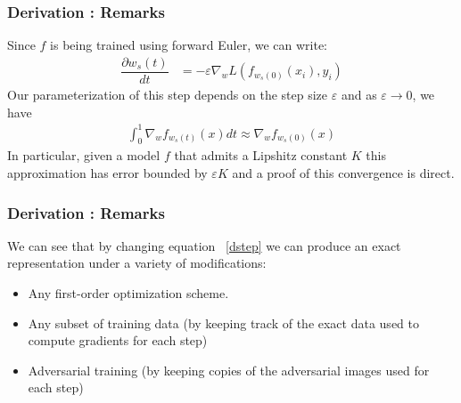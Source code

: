 \begin{frame}
  \frametitle{Derivation : Remarks}
Since $f$ is being trained using forward Euler, we can write:
\begin{align}
    \dfrac{\partial w_s(t)}{dt} &= -\varepsilon \nabla_w L(f_{w_s(0)}(x_i), y_i) \label{dstep}%
\end{align}
Our parameterization of this step depends on the step size $\varepsilon$ and as $\varepsilon \to 0$, we have 
\begin{align}
    \int_0^1 \nabla_w f_{w_{s}(t)}(x)dt \approx \nabla_w f_{w_s(0)}(x)
\end{align}
In particular, given a model $f$ that admits a Lipshitz constant $K$
this approximation has error bounded by $\varepsilon K$ and a proof of
this convergence is direct. 
\end{frame}


\begin{frame}
  \frametitle{Derivation : Remarks}
  We can see that by changing equation ~\ref{dstep} we can produce an
  exact representation under a variety of modifications:
  \begin{itemize}
  \item Any first-order optimization scheme.
\item Any subset of training data (by keeping track of the exact
  data used to compute gradients for each step)
\item Adversarial training (by keeping copies of the adversarial
  images used for each step)
\end{itemize}
\end{frame}

